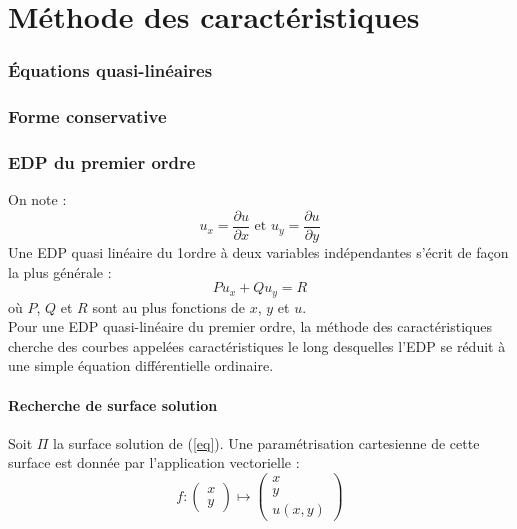 \part{Méthode des caractéristiques}
\section{Équations quasi-linéaires}

\section{Forme conservative}

\section{EDP du premier ordre}
On note : \[u_x=\frac{\partial u}{\partial x} \text{ et } u_y=\frac{\partial u}{\partial y}\]
Une EDP quasi linéaire du 1\ier ordre à deux variables indépendantes s'écrit de façon la plus générale :
	\begin{equation} \label{eq} Pu_x+Qu_y=R \end{equation}
où $P$, $Q$ et $R$ sont au plus fonctions de $x$, $y$ et $u$. \\
Pour une EDP quasi-linéaire du premier ordre, la méthode des caractéristiques cherche des courbes appelées caractéristiques le long desquelles l'EDP se réduit à une simple équation différentielle ordinaire.

\subsection{Recherche de surface solution}
Soit $\Pi$ la surface solution de (\ref{eq}). Une paramétrisation cartesienne de cette surface est donnée par l'application vectorielle : 
\[f:\begin{pmatrix}x\\y\end{pmatrix}\mapsto \begin{pmatrix}x\\y\\u(x,y)\end{pmatrix}\]

